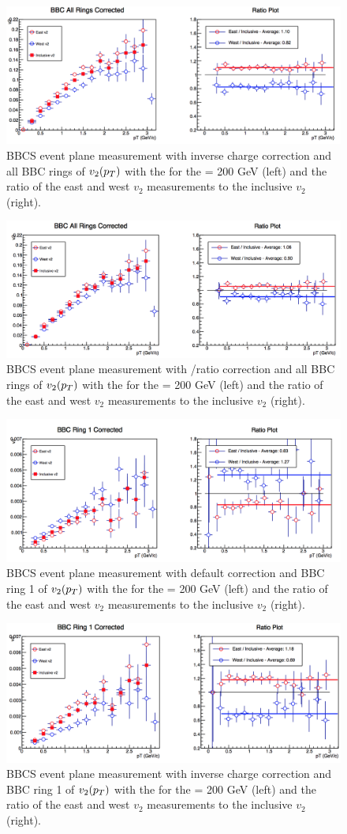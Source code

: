 \begin{figure}[!ht]
\centering
\includegraphics[width=0.65\linewidth]{figs/bbc_all_data.png}
\caption{BBCS event plane measurement with inverse charge correction and all BBC rings of $v_{2}(\mbox{$p_T$})$ with the  for the \pau \sqsn = 200 GeV (left) and the ratio of the east and west $v_2$ measurements to the inclusive $v_2$ (right).}
\end{figure}

\begin{figure}[!ht]
\centering
\includegraphics[width=0.65\linewidth]{figs/bbc_all_pp.png}
\caption{BBCS event plane measurement with \pp/\pau ratio correction and all BBC rings of $v_{2}(\mbox{$p_T$})$ with the  for the \pau \sqsn = 200 GeV (left) and the ratio of the east and west $v_2$ measurements to the inclusive $v_2$ (right).}
\end{figure}

\begin{figure}[!ht]
\centering
\includegraphics[width=0.65\linewidth]{figs/bbc_1_default.png}
\caption{BBCS event plane measurement with default correction and BBC ring 1 of $v_{2}(\mbox{$p_T$})$ with the  for the \pau \sqsn = 200 GeV (left) and the ratio of the east and west $v_2$ measurements to the inclusive $v_2$ (right).}
\end{figure}

\begin{figure}[!ht]
\centering
\includegraphics[width=0.65\linewidth]{figs/bbc_1_data.png}
\caption{BBCS event plane measurement with inverse charge correction and BBC ring 1 of $v_{2}(\mbox{$p_T$})$ with the  for the \pau \sqsn = 200 GeV (left) and the ratio of the east and west $v_2$ measurements to the inclusive $v_2$ (right).}
\end{figure}

